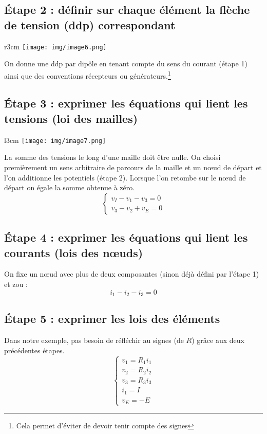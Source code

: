 \documentclass	[11pt, a4paper, openany]{book}
\begin{document}
\subsection{Étape 2 : définir sur chaque élément la flèche de tension (ddp) correspondant}
\begin{wrapfigure}[4]{r}{3cm}
\texttt{[image: img/image6.png]}
\end{wrapfigure}
On donne une ddp par dipôle en tenant compte du sens du courant (étape 1) ainsi que des conventions récepteurs ou générateurs.\footnote{Cela permet d'éviter de devoir tenir compte des signes}

\subsection{Étape 3 : exprimer les équations qui lient les tensions (loi des mailles)}
\begin{wrapfigure}[4]{l}{3cm}
\texttt{[image: img/image7.png]}
\end{wrapfigure}
La somme des tensions le long d'une maille doit être nulle. On choisi premièrement un sens arbitraire de parcours de la maille et un nœud de départ et l'on additionne les potentiels (étape 2). Lorsque l'on retombe sur le nœud de départ on égale la somme obtenue à zéro.
\begin{equation}
\left\{\begin{array}{l}
v_I - v_1 -v_3 = 0\\
v_3 - v_2 + v_E = 0
\end{array}\right.
\end{equation}

\subsection{Étape 4 : exprimer les équations qui lient les courants (lois des nœuds)}
On fixe un nœud avec plus de deux composantes (sinon déjà défini par l'étape 1) et zou : 
\begin{equation}
i_1 - i_2 - i_3 = 0
\end{equation}

\subsection{Étape 5 : exprimer les lois des éléments}
Dans notre exemple, pas besoin de réfléchir au signes (de $R$) grâce aux deux précédentes étapes.
\begin{equation}
\left\{\begin{array}{l}
v_1 = R_1i_1\\
v_2 = R_2i_2\\
v_3 = R_3i_3\\
i_1 = I\\
v_E = - E
\end{array}\right.
\end{equation}
\end{document}
